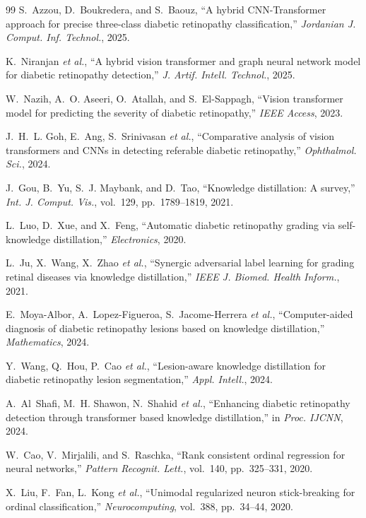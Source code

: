 \documentclass[10pt, twocolumn]{article}
\begin{document}
\begin{thebibliography}{99}
S.~Azzou, D.~Boukredera, and S.~Baouz, ``A hybrid CNN-Transformer approach for precise three-class diabetic retinopathy classification,'' \textit{Jordanian J. Comput. Inf. Technol.}, 2025.

K.~Niranjan \textit{et al.}, ``A hybrid vision transformer and graph neural network model for diabetic retinopathy detection,'' \textit{J. Artif. Intell. Technol.}, 2025.

W.~Nazih, A.~O. Aseeri, O.~Atallah, and S.~El-Sappagh, ``Vision transformer model for predicting the severity of diabetic retinopathy,'' \textit{IEEE Access}, 2023.

J.~H.~L. Goh, E.~Ang, S.~Srinivasan \textit{et al.}, ``Comparative analysis of vision transformers and CNNs in detecting referable diabetic retinopathy,'' \textit{Ophthalmol. Sci.}, 2024.

J.~Gou, B.~Yu, S.~J. Maybank, and D.~Tao, ``Knowledge distillation: A survey,'' \textit{Int. J. Comput. Vis.}, vol.~129, pp.~1789--1819, 2021.

L.~Luo, D.~Xue, and X.~Feng, ``Automatic diabetic retinopathy grading via self-knowledge distillation,'' \textit{Electronics}, 2020.

L.~Ju, X.~Wang, X.~Zhao \textit{et al.}, ``Synergic adversarial label learning for grading retinal diseases via knowledge distillation,'' \textit{IEEE J. Biomed. Health Inform.}, 2021.

E.~Moya-Albor, A.~Lopez-Figueroa, S.~Jacome-Herrera \textit{et al.}, ``Computer-aided diagnosis of diabetic retinopathy lesions based on knowledge distillation,'' \textit{Mathematics}, 2024.

Y.~Wang, Q.~Hou, P.~Cao \textit{et al.}, ``Lesion-aware knowledge distillation for diabetic retinopathy lesion segmentation,'' \textit{Appl. Intell.}, 2024.

A.~Al~Shafi, M.~H. Shawon, N.~Shahid \textit{et al.}, ``Enhancing diabetic retinopathy detection through transformer based knowledge distillation,'' in \textit{Proc. IJCNN}, 2024.

W.~Cao, V.~Mirjalili, and S.~Raschka, ``Rank consistent ordinal regression for neural networks,'' \textit{Pattern Recognit. Lett.}, vol.~140, pp.~325--331, 2020.

X.~Liu, F.~Fan, L.~Kong \textit{et al.}, ``Unimodal regularized neuron stick-breaking for ordinal classification,'' \textit{Neurocomputing}, vol.~388, pp.~34--44, 2020.


\end{thebibliography}
\end{document}
